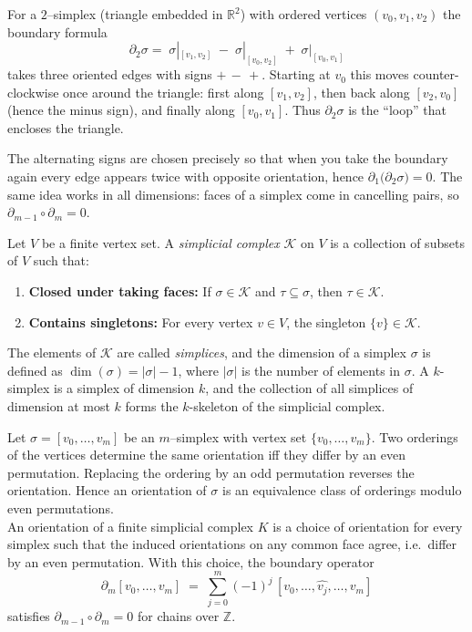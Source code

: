 \begin{remark}
For a $2$–simplex (triangle embedded in $\mathbb{R}^2$) with ordered vertices $(v_0,v_1,v_2)$
the boundary formula
\[
\partial_2\sigma
  =\;
    \sigma|_{[v_1,v_2]}
  \;-\;
    \sigma|_{[v_0,v_2]}
  \;+\;
    \sigma|_{[v_0,v_1]}
\]
takes three oriented edges with signs
$+\, -\, +$.
Starting at $v_0$ this moves counter-clockwise once around the
triangle: first along $[v_1,v_2]$, then back along $[v_2,v_0]$ (hence the
minus sign), and finally along $[v_0,v_1]$.
Thus $\partial_2\sigma$ is the “loop” that encloses the triangle.

The alternating signs are chosen precisely so that when you take the
boundary again every edge appears twice with opposite orientation,
hence $\partial_{1}\!\bigl(\partial_{2}\sigma\bigr)=0$.
The same idea works in all dimensions: faces of a simplex come in
cancelling pairs, so $\partial_{m-1}\circ\partial_{m}=0$.
\end{remark}


\begin{definition}
Let \(V\) be a finite vertex set. A \emph{simplicial complex} \(\mathcal{K}\) on \(V\) is a collection of subsets of \(V\) such that:
\begin{enumerate}
    \item \textbf{Closed under taking faces:} If \(\sigma \in \mathcal{K}\) and \(\tau \subseteq \sigma\), then \(\tau \in \mathcal{K}\).
    \item \textbf{Contains singletons:} For every vertex \(v \in V\), the singleton \(\{v\} \in \mathcal{K}\).
\end{enumerate}
The elements of \(\mathcal{K}\) are called \emph{simplices}, and the dimension of a simplex \(\sigma\) is defined as \(\dim(\sigma) = |\sigma| - 1\), where \(|\sigma|\) is the number of elements in \(\sigma\). A \(k\)-simplex is a simplex of dimension \(k\), and the collection of all simplices of dimension at most \(k\) forms the \(k\)-skeleton of the simplicial complex.
\end{definition}


\begin{definition}[Orientation]
    Let $\sigma=[v_0,\dots,v_m]$ be an $m$–simplex with vertex set $\{v_0,\dots,v_m\}$. Two orderings of the vertices determine the same orientation iff they differ by an even permutation.
    Replacing the ordering by an odd permutation reverses the orientation. Hence an orientation of $\sigma$ is an equivalence class of orderings modulo even permutations.\\
    An orientation of a finite simplicial complex $K$ is a choice of orientation for every simplex such that the induced orientations on any common face agree, i.e.\ differ by an even permutation.
    With this choice, the boundary operator
        \[
          \partial_m[v_0,\dots,v_m]
          \;=\;\sum_{j=0}^{m}(-1)^{j}\,[v_0,\dots,\widehat{v_j},\dots,v_m]
        \]
        satisfies $\partial_{m-1}\circ\partial_m=0$ for chains over
        $\mathbb Z$.
\end{definition}

